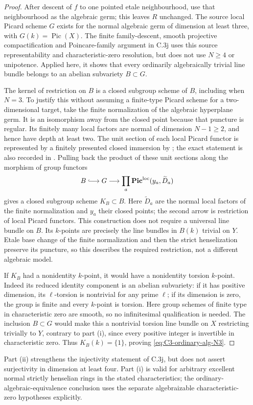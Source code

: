 \begin{proof}
After descent of $f$ to one pointed etale
neighbourhood, use that neighbourhood as the
algebraic germ; this leaves $R$ unchanged.
The source local Picard scheme $G$ exists for
the normal algebraic germ of dimension at least
three, with $G(k)=\operatorname{Pic}(X)$.
The finite family-descent, smooth projective
compactification and Poincare-family argument
in C.3j uses this source representability and
characteristic-zero resolution, but does not
use $N\ge4$ or unipotence. Applied here, it shows
that every ordinarily algebraically trivial
line bundle belongs to an abelian subvariety
$B\subset G$.

The kernel of restriction on $B$ is a closed
subgroup scheme of $B$, including when $N=3$.
To justify this without assuming a finite-type
Picard scheme for a two-dimensional target,
take the finite normalization of the algebraic
hyperplane germ. It is an isomorphism away
from the closed point because that puncture
is regular. Its finitely many local factors
are normal of dimension $N-1\ge2$, and hence
have depth at least two. The unit section of
each local Picard functor is represented by
a finitely presented closed immersion by
\citet[Theorem 1(i), Introduction, p.~VII]{D_Boutot1978};
the exact statement is also recorded in
\citet[Definition 3.3, p.~468]{D_Kollar2016LocalPicard}.
Pulling back the product of these unit
sections along the morphism of group functors
\[
 B\lhook\joinrel\longrightarrow G
       \longrightarrow
       \prod_a\mathbf{Pic}^{\mathrm{loc}}(y_a,\widetilde D_a)
\]
gives a closed subgroup scheme $K_B\subset B$.
Here $\widetilde D_a$ are the normal local
factors of the finite normalization and
$y_a$ their closed points; the second arrow
is restriction of local Picard functors.
This construction does not require a
universal line bundle on $B$.
Its $k$-points are precisely
the line bundles in $B(k)$ trivial on $Y$.
Etale base change of the finite normalization
and then the strict henselization preserve
its puncture, so this describes the required
restriction, not a different algebraic model.

If $K_B$ had a nonidentity $k$-point, it would
have a nonidentity torsion $k$-point. Indeed
its reduced identity component is an abelian
subvariety: if it has positive dimension,
its $\ell$-torsion is nontrivial for any prime
$\ell$; if its dimension is zero, the group
is finite and every $k$-point is torsion.
Here group schemes of finite type in
characteristic zero are smooth, so no
infinitesimal qualification is needed.
The inclusion $B\subset G$ would make this
a nontrivial torsion line bundle on $X$
restricting trivially to $Y$, contrary to
part (i), since every positive integer is
invertible in characteristic zero. Thus
$K_B(k)=\{1\}$, proving
\eqref{eq:C3-ordinary-alg-N3}.
\end{proof}

Part (ii) strengthens the injectivity statement
of C.3j, but does not assert surjectivity in
dimension at least four. Part (i) is valid
for arbitrary excellent normal strictly
henselian rings in the stated characteristics;
the ordinary-algebraic-equivalence conclusion
uses the separate algebraizable
characteristic-zero hypotheses explicitly.
